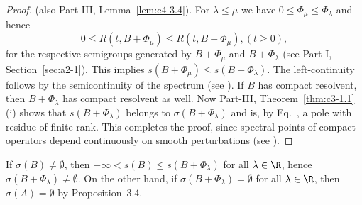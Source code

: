 \begin{proof} (\cf also Part-III, Lemma~\ref{lem:c4-3.4}). 
For $\lambda \leq \mu$ we have $0 \leq \Phi_\mu \leq \Phi_\lambda$ and hence 
\[
0 \leq R(t, B +\Phi_\mu) \leq R(t,B+\Phi_\mu) , (t\geq 0) , 
\]
for the respective semigroups generated by $B + \Phi_\mu$ and $B + \Phi_\lambda$ (see Part-I, Section~\ref{sec:a2-1}). 
This implies $s(B + \Phi_\mu) \leq s(B + \Phi_\lambda)$. 
The left-continuity follows by the semicontinuity of the spectrum (see \textcite[Chapter~IV, Theorem~3.1]{kato:1976}). 
If\/ $B$ has compact resolvent, then $B + \Phi_\lambda$ has compact resolvent as well. 
Now Part-III, Theorem~\ref{thm:c3-1.1}\,(i) shows that $s(B + \Phi_\lambda)$ belongs to $\sigma(B + \Phi_\lambda)$ and is, by Eq.~, a pole with residue of finite rank. 
This completes the proof, since spectral points of compact operators depend continuously on smooth perturbations (see \textcite[VII,6.Theorem~9]{dunfordschwartz:1958}).
\end{proof}
If\/ $\sigma(B) \neq \emptyset$, then $-\infty < s(B) \leq s(B + \Phi_\lambda)$ for all $\lambda \in \R$, 
hence $\sigma(B + \Phi_\lambda) \neq \emptyset$. 
On the other hand, if\/ $\sigma(B + \Phi_\lambda) = \emptyset$ for all $\lambda \in \R$,  then $\sigma(A) = \emptyset$ by Proposition~3.4.

